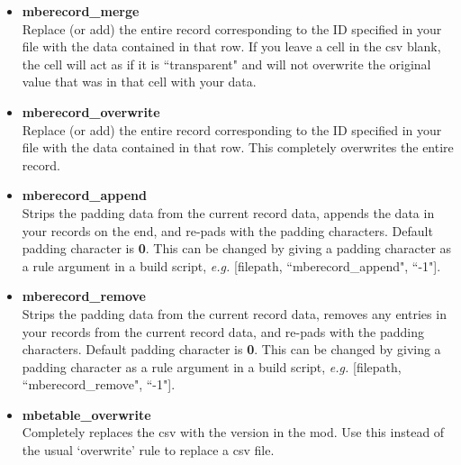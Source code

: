 \documentclass{article}
\begin{document}
\begin{itemize}
	\item \textbf{mberecord\_merge}\\
	Replace (or add) the entire record corresponding to the ID specified in your file with the data contained in that row. If you leave a cell in the csv blank, the cell will act as if it is ``transparent" and will not overwrite the original value that was in that cell with your data.
	\item \textbf{mberecord\_overwrite}\\
	Replace (or add) the entire record corresponding to the ID specified in your file with the data contained in that row. This completely overwrites the entire record.
	\item \textbf{mberecord\_append}\\
	Strips the padding data from the current record data, appends the data in your records on the end, and re-pads with the padding characters. Default padding character is \textbf{0}. This can be changed by giving a padding character as a rule argument in a build script, \textit{e.g.} [filepath, ``mberecord\_append", ``-1"].
	\item \textbf{mberecord\_remove}\\
	Strips the padding data from the current record data, removes any entries in your records from the current record data, and re-pads with the padding characters. Default padding character is \textbf{0}. This can be changed by giving a padding character as a rule argument in a build script, \textit{e.g.} [filepath, ``mberecord\_remove", ``-1"].
	\item \textbf{mbetable\_overwrite}\\
	Completely replaces the csv with the version in the mod. Use this instead of the usual `overwrite' rule to replace a csv file.
\end{itemize}
\end{document}
